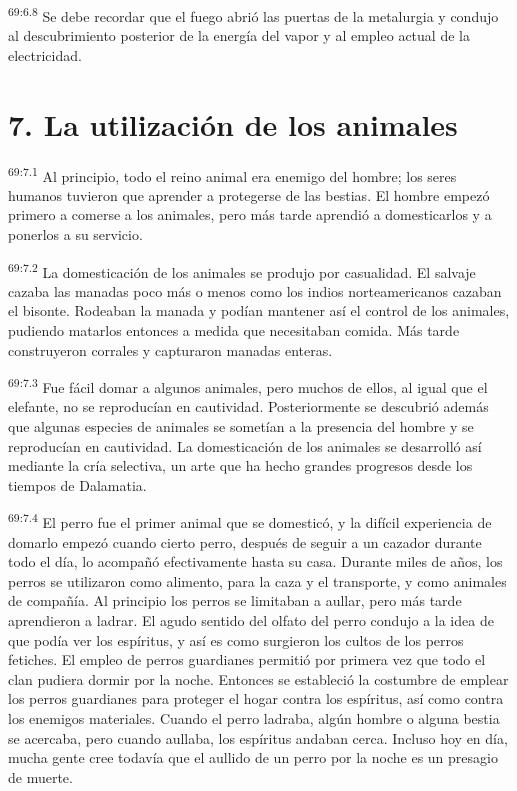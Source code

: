\documentclass[twoside, 11pt]{book}
\begin{document}
\par
\textsuperscript{69:6.8} Se debe recordar que el fuego abrió las puertas de la metalurgia y condujo al descubrimiento posterior de la energía del vapor y al empleo actual de la electricidad.

\section*{7. La utilización de los animales}
\par
\textsuperscript{69:7.1} Al principio, todo el reino animal era enemigo del hombre; los seres humanos tuvieron que aprender a protegerse de las bestias. El hombre empezó primero a comerse a los animales, pero más tarde aprendió a domesticarlos y a ponerlos a su servicio.

\par
\textsuperscript{69:7.2} La domesticación de los animales se produjo por casualidad. El salvaje cazaba las manadas poco más o menos como los indios norteamericanos cazaban el bisonte. Rodeaban la manada y podían mantener así el control de los animales, pudiendo matarlos entonces a medida que necesitaban comida. Más tarde construyeron corrales y capturaron manadas enteras.

\par
\textsuperscript{69:7.3} Fue fácil domar a algunos animales, pero muchos de ellos, al igual que el elefante, no se reproducían en cautividad. Posteriormente se descubrió además que algunas especies de animales se sometían a la presencia del hombre y se reproducían en cautividad. La domesticación de los animales se desarrolló así mediante la cría selectiva, un arte que ha hecho grandes progresos desde los tiempos de Dalamatia.

\par
\textsuperscript{69:7.4} El perro fue el primer animal que se domesticó, y la difícil experiencia de domarlo empezó cuando cierto perro, después de seguir a un cazador durante todo el día, lo acompañó efectivamente hasta su casa. Durante miles de años, los perros se utilizaron como alimento, para la caza y el transporte, y como animales de compañía. Al principio los perros se limitaban a aullar, pero más tarde aprendieron a ladrar. El agudo sentido del olfato del perro condujo a la idea de que podía ver los espíritus, y así es como surgieron los cultos de los perros fetiches. El empleo de perros guardianes permitió por primera vez que todo el clan pudiera dormir por la noche. Entonces se estableció la costumbre de emplear los perros guardianes para proteger el hogar contra los espíritus, así como contra los enemigos materiales. Cuando el perro ladraba, algún hombre o alguna bestia se acercaba, pero cuando aullaba, los espíritus andaban cerca. Incluso hoy en día, mucha gente cree todavía que el aullido de un perro por la noche es un presagio de muerte.
\end{document}

